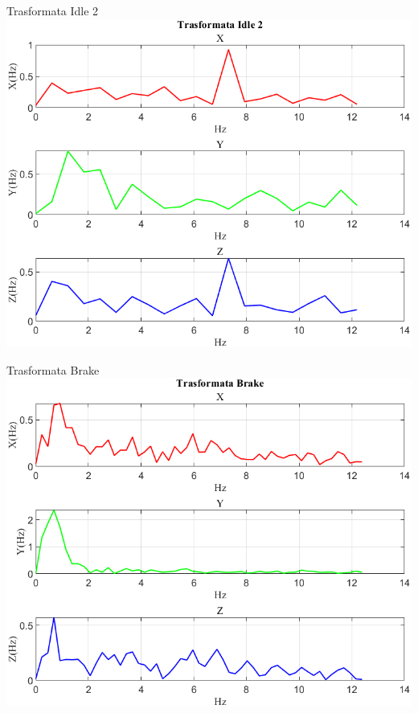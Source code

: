 \documentclass[beamer]{standalone}
\begin{document}
	\begin{frame}{{Trasformata Idle 2}}
		\centering\includegraphics[height=.8\textheight]{figure/Mag/Trasformata/Trasformata Idle 2}
	\end{frame}
	
	\begin{frame}{{Trasformata Brake}}
		\centering\includegraphics[height=.8\textheight]{figure/Mag/Trasformata/Trasformata Brake}
	\end{frame}
	
\end{document}
